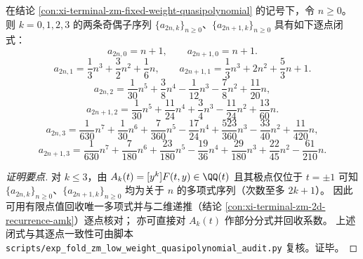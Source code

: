 \begin{conclusion}\label{con:xi-terminal-zm-fixed-weight-kle3-closed}
在结论 \ref{con:xi-terminal-zm-fixed-weight-quasipolynomial} 的记号下，令 \(n\ge 0\)。
则 \(k=0,1,2,3\) 的两条奇偶子序列 \(\{a_{2n,k}\}_{n\ge 0}\)、\(\{a_{2n+1,k}\}_{n\ge 0}\) 具有如下逐点闭式：
\[
a_{2n,0}=n+1,\qquad a_{2n+1,0}=n+1.
\]
\[
a_{2n,1}=\frac{1}{3}n^3+\frac{3}{2}n^2+\frac{1}{6}n,
\qquad
a_{2n+1,1}=\frac{1}{3}n^3+2n^2+\frac{5}{3}n+1.
\]
\[
a_{2n,2}=\frac{1}{30}n^5+\frac{3}{8}n^4-\frac{1}{12}n^3-\frac{7}{8}n^2+\frac{11}{20}n,
\]
\[
a_{2n+1,2}=\frac{1}{30}n^5+\frac{11}{24}n^4+\frac{3}{4}n^3-\frac{11}{24}n^2+\frac{13}{60}n.
\]
\[
a_{2n,3}=\frac{1}{630}n^7+\frac{1}{30}n^6+\frac{7}{360}n^5-\frac{17}{24}n^4+\frac{523}{360}n^3-\frac{33}{40}n^2+\frac{11}{420}n,
\]
\[
a_{2n+1,3}=\frac{1}{630}n^7+\frac{7}{180}n^6+\frac{23}{180}n^5-\frac{19}{36}n^4+\frac{29}{180}n^3+\frac{22}{45}n^2-\frac{61}{210}n.
\]
\end{conclusion}
\begin{proof}[证明要点]
对 \(k\le 3\)，由 \(A_k(t)=[y^k]F(t,y)\in\QQ(t)\) 且其极点仅位于 \(t=\pm1\) 可知
\(\{a_{2n,k}\}_{n\ge 0}\)、\(\{a_{2n+1,k}\}_{n\ge 0}\)
均为关于 \(n\) 的多项式序列（次数至多 \(2k+1\)）。
因此可用有限点值回收唯一多项式并与二维递推（结论 \ref{con:xi-terminal-zm-2d-recurrence-amk}）逐点核对；
亦可直接对 \(A_k(t)\) 作部分分式并回收系数。
上述闭式与其逐点一致性可由脚本 \texttt{scripts/exp\_fold\_zm\_low\_weight\_quasipolynomial\_audit.py} 复核。证毕。
\end{proof}

